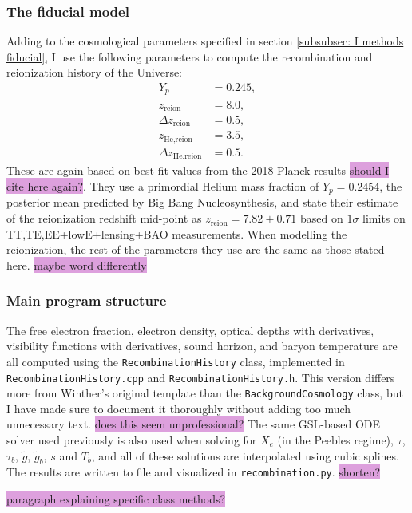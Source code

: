 \documentclass{aa}
\begin{document}
\subsubsection{The fiducial model}
Adding to the cosmological parameters specified in section \ref{subsubsec: I methods fiducial}, I use the following parameters to compute the recombination and reionization history of the Universe:
\begin{align*}
  Y_p &= 0.245,
  \\
  z_\text{reion} &= 8.0,
  \\
  \Delta z_\text{reion} &= 0.5,
  \\
  z_\text{He,reion} &= 3.5,
  \\
  \Delta z_\text{He,reion} &= 0.5.
\end{align*}
These are again based on best-fit values from the 2018 Planck results \colorbox{Plum}{should I cite here again?}. They use a primordial Helium mass fraction of $Y_p=0.2454$, the posterior mean predicted by Big Bang Nucleosynthesis, and state their estimate of the reionization redshift mid-point as $z_\text{reion}=7.82\pm0.71$ based on $1\sigma$ limits on TT,TE,EE+lowE+lensing+BAO measurements. When modelling the reionization, the rest of the parameters they use are the same as those stated here. \colorbox{Plum}{maybe word differently}

\subsubsection{Main program structure}
The free electron fraction, electron density, optical depths with derivatives, visibility functions with derivatives, sound horizon, and baryon temperature are all computed using the \verb|RecombinationHistory| class, implemented in \verb|RecombinationHistory.cpp| and \verb|RecombinationHistory.h|. This version differs more from Winther's original template than the \verb|BackgroundCosmology| class, but I have made sure to document it thoroughly without adding too much unnecessary text. \colorbox{Plum}{does this seem unprofessional?} The same GSL-based ODE solver used previously is also used when solving for $X_e$ (in the Peebles regime), $\tau$, $\tau_b$, $\tilde{g}$, $\tilde{g}_b$, $s$ and $T_b$, and all of these solutions are interpolated using cubic splines. The results are written to file and visualized in \verb|recombination.py|. \colorbox{Plum}{shorten?}

\colorbox{Plum}{paragraph explaining specific class methods?}
\end{document}
